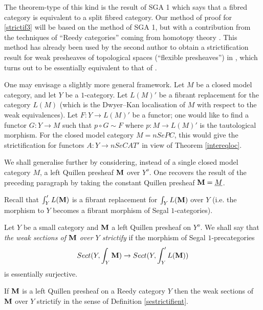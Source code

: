 The theorem-type of this kind is the result of SGA 1 \cite{SGA1}
which says that a fibred category is equivalent to a split fibred category.
Our method of proof
for \ref{strictif3} will be
based on the method of SGA 1, but with a contribution from the techniques of
``Reedy categories'' coming from homotopy theory \cite{Reedy}
\cite{BousfieldKan} \cite{Hirschhorn} \cite{DHK} \cite{DwyerKanDiags}.
This method has already been used by the second author
to obtain a strictification result
for weak presheaves of topological spaces
(``flexible presheaves'') in \cite{flexible},
which turns out to be essentially equivalent to that of
\cite{DwyerKanDiags}.


One may envisage a slightly more general framework.
Let $M$ be a closed model category, and let $Y$ be a
$1$-category. Let $L(M)'$ be a fibrant replacement for the category
$L(M)$ (which is the Dwyer--Kan localisation of $M$ with respect to the weak
equivalences). Let
$F: Y \rightarrow L(M)'$ be a functor; one would like to find a functor
$G: Y \rightarrow M$ such
that
$p\circ G \sim F$ where $p: M\rightarrow L(M)'$ is the tautological morphism.
For the
closed model category $M=nSePC$, this would give the strictification for
functors $A:Y \rightarrow nSeCAT'$ in view of
Theorem \ref{intereqloc}.


We shall generalise further by considering, instead of a single
closed model category $M$, a left Quillen presheaf
${\bf M}$ over $Y ^o$. One recovers the result of the preceding paragraph by
taking the constant Quillen presheaf ${\bf M} = \underline{M}$.

Recall that $\int '_YL({\bf M} )$ is a fibrant replacement for $\int
_YL({\bf M} )$ over $Y$
(i.e. the morphism to $Y$ becomes a fibrant morphism of
Segal $1$-categories).

\begin{definition}
\label{sestrictifient}
Let $Y$ be a small category and ${\bf M}$ a left Quillen presheaf
on $Y^o$. We shall say that {\em the weak sections of ${\bf M}$ over $Y$
strictify} if the morphism of Segal $1$-precategories
$$
Sect (Y, \int _Y{\bf M} )\rightarrow Sect (Y, \int '_YL({\bf M} ))
$$
is essentially surjective.
\end{definition}



\begin{theorem}
\label{strictif1A}
If ${\bf M} $ is a left Quillen presheaf on a Reedy category
$Y$ then the weak sections of ${\bf M}$ over $Y$ strictify in the sense of
Definition \ref{sestrictifient}.
\end{theorem}


